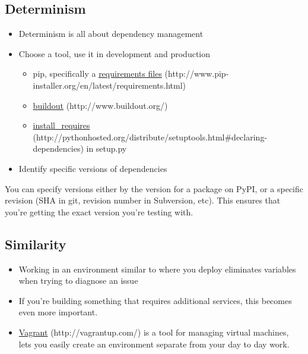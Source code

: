 \documentclass[letterpaper,10pt,english]{sphinxmanual}
\begin{document}
\subsection{Determinism}
\label{tutorial/getting-started:determinism}\begin{itemize}
\item {} 
Determinism is all about dependency management

\item {} 
Choose a tool, use it in development and production
\begin{itemize}
\item {} 
pip, specifically a \href{http://www.pip-installer.org/en/latest/requirements.html}{requirements files} (http://www.pip-installer.org/en/latest/requirements.html)

\item {} 
\href{http://www.buildout.org/}{buildout} (http://www.buildout.org/)

\item {} 
\href{http://pythonhosted.org/distribute/setuptools.html\#declaring-dependencies}{install\_requires} (http://pythonhosted.org/distribute/setuptools.html\#declaring-dependencies) in setup.py

\end{itemize}

\item {} 
Identify specific versions of dependencies

\end{itemize}

You can specify versions either by the version for a package on
PyPI, or a specific revision (SHA in git, revision number in
Subversion, etc). This ensures that you're getting the exact
version you're testing with.


\subsection{Similarity}
\label{tutorial/getting-started:install-requires}\label{tutorial/getting-started:similarity}\begin{itemize}
\item {} 
Working in an environment similar to where you deploy eliminates
variables when trying to diagnose an issue

\item {} 
If you're building something that requires additional services, this
becomes even more important.

\item {} 
\href{http://vagrantup.com/}{Vagrant} (http://vagrantup.com/) is a tool for managing virtual machines, lets you easily
create an environment separate from your day to day work.

\end{itemize}
\end{document}
